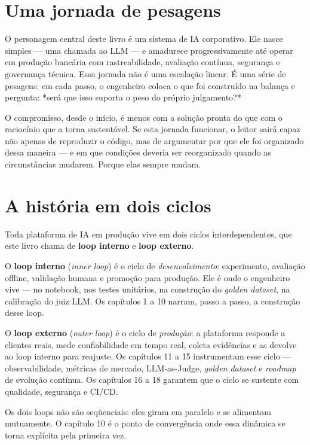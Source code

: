 \section*{Uma jornada de pesagens}

O personagem central deste livro é um sistema de IA corporativo. Ele
nasce simples --- uma chamada ao LLM --- e amadurece progressivamente até
operar em produção bancária com rastreabilidade, avaliação contínua,
segurança e governança técnica. Essa jornada não é uma escalação linear.
É uma série de pesagens: em cada passo, o engenheiro coloca o que foi
construído na balança e pergunta: *será que isso suporta o peso do
próprio julgamento?*

O compromisso, desde o início, é menos com a solução pronta do que com
o raciocínio que a torna sustentável. Se esta jornada funcionar, o
leitor sairá capaz não apenas de reproduzir o código, mas de argumentar
por que ele foi organizado dessa maneira --- e em que condições deveria
ser reorganizado quando as circunstâncias mudarem. Porque elas sempre
mudam.

\section*{A hist\'oria em dois ciclos}

Toda plataforma de IA em produ\c{c}\~ao vive em dois ciclos
interdependentes, que este livro chama de \textbf{loop interno} e
\textbf{loop externo}.

O \textbf{loop interno} (\textit{inner loop}) \'e o ciclo de
\textit{desenvolvimento}: experimento, avalia\c{c}\~ao offline,
valida\c{c}\~ao humana e promo\c{c}\~ao para produ\c{c}\~ao. Ele \'e
onde o engenheiro vive --- no notebook, nos testes unit\'arios, na
constru\c{c}\~ao do \textit{golden dataset}, na calibra\c{c}\~ao do
juiz LLM. Os cap\'itulos 1 a 10 narram, passo a passo, a constru\c{c}\~ao
desse loop.

O \textbf{loop externo} (\textit{outer loop}) \'e o ciclo de
\textit{produ\c{c}\~ao}: a plataforma responde a clientes reais, mede
confiabilidade em tempo real, coleta evid\^encias e as devolve ao
loop interno para reajuste. Os cap\'itulos 11 a 15 instrumentam esse
ciclo --- observabilidade, m\'etricas de mercado, LLM-as-Judge,
\textit{golden dataset} e \textit{roadmap} de evolu\c{c}\~ao cont\'inua.
Os cap\'itulos 16 a 18 garantem que o ciclo se sustente com qualidade,
seguran\c{c}a e CI/CD.

Os dois loops n\~ao s\~ao seq\"uenciais: eles giram em paralelo e
se alimentam mutuamente. O cap\'itulo 10 \'e o ponto de converg\^encia
onde essa din\^amica se torna expl\'icita pela primeira vez.

